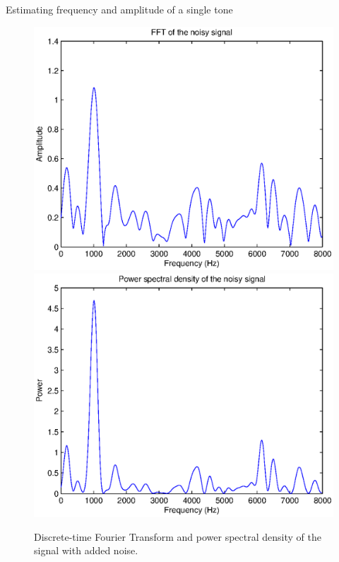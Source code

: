 ﻿\documentclass[mathserif]{beamer}
\begin{document}
	\begin{frame}{Estimating frequency and amplitude of a single tone}
		\begin{figure}
			\centering
			\includegraphics[scale=0.375]{./img3/singleTonewoMHFig2.eps}
			\includegraphics[scale=0.375]{./img3/singleTonewoMHFig3.eps}
			\caption{Discrete-time Fourier Transform and power spectral density of the signal with added noise.}
		\end{figure}
	\end{frame}
	
\end{document}
